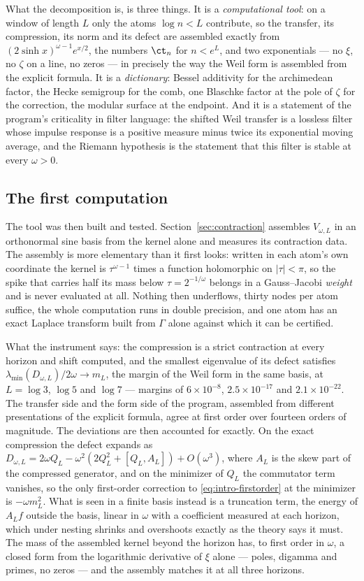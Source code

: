 What the decomposition is, is three things. It is a \emph{computational tool}:
on a window of length $L$ only the atoms $\log n<L$ contribute, so the
transfer, its compression, its norm and its defect are assembled exactly from
$(2\sinh x)^{\omega-1}e^{x/2}$, the numbers $\ct_n$ for $n<e^L$, and two
exponentials --- no $\xi$, no $\zeta$ on a line, no zeros --- in precisely the
way the Weil form is assembled from the explicit formula. It is a
\emph{dictionary}: Bessel additivity for the archimedean factor, the Hecke
semigroup for the comb, one Blaschke factor at the pole of $\zeta$ for the
correction, the modular surface at the endpoint. And it is a statement of the
program's criticality in filter language: the shifted Weil transfer is a
lossless filter whose impulse response is a positive measure minus twice its
exponential moving average, and the Riemann hypothesis is the statement that
this filter is stable at every $\omega>0$.

\subsection{The first computation}

The tool was then built and tested. Section~\ref{sec:contraction} assembles
$V_{\omega,L}$ in an orthonormal sine basis from the kernel alone and measures
its contraction data. The assembly is more elementary than it first looks:
written in each atom's own coordinate the kernel is $\tau^{\omega-1}$ times a
function holomorphic on $|\tau|<\pi$, so the spike that carries half its mass
below $\tau=2^{-1/\omega}$ belongs in a Gauss--Jacobi \emph{weight} and is never
evaluated at all. Nothing then underflows, thirty nodes per atom suffice, the
whole computation runs in double precision, and one atom has an exact Laplace
transform built from $\Gamma$ alone against which it can be certified.

What the instrument says: the compression is a strict contraction at every
horizon and shift computed, and the smallest eigenvalue of its defect satisfies
$\lambda_{\min}(D_{\omega,L})/2\omega\to m_L$, the margin of the Weil form in the
same basis, at $L=\log3$, $\log5$ and $\log7$ --- margins of
$6\times10^{-8}$, $2.5\times10^{-17}$ and $2.1\times10^{-22}$. The transfer side and
the form side of the program, assembled from different presentations of the
explicit formula, agree at first order over fourteen orders of magnitude. The
deviations are then accounted for exactly. On the exact compression the defect
expands as $D_{\omega,L}=2\omega Q_L-\omega^2(2Q_L^2+[Q_L,A_L])+O(\omega^3)$,
where $A_L$ is the skew part of the compressed generator, and on the minimizer
of $Q_L$ the commutator term vanishes, so the only first-order correction to
\eqref{eq:intro-firstorder} at the minimizer is $-\omega m_L^2$. What is seen in
a finite basis instead is a truncation term, the energy of $A_Lf$ outside the
basis, linear in $\omega$ with a coefficient measured at each horizon, which
under nesting shrinks and overshoots exactly as the theory says it must. The
mass of the assembled kernel beyond the horizon has, to first order in $\omega$,
a closed form from the logarithmic derivative of $\xi$ alone --- poles, digamma
and primes, no zeros --- and the assembly matches it at all three horizons.

